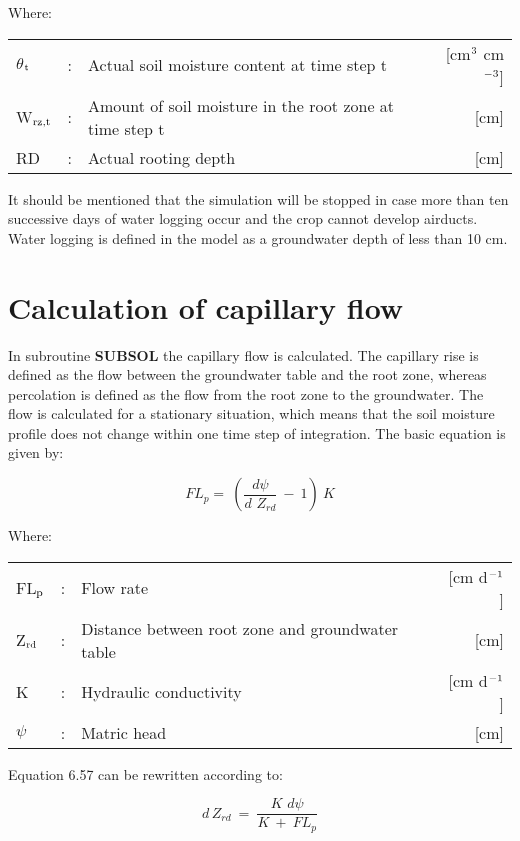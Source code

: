 Where:\\[5pt]
\begin{tabularx}{\textwidth}{llXr}
$\theta$$_{{\rm t}}$ &:& Actual soil moisture content at time step t  & [cm$^{{\rm 3}}$ cm$^{{\rm -3}}$]\\
W$_{{\rm rz,t}}$ &:& Amount of soil moisture in the root zone at time step t  & [cm]\\
RD &:& Actual rooting depth  & [cm]\\
\end{tabularx}

It should be mentioned that the simulation will be stopped in case more than ten successive
days of water logging occur and the crop cannot develop airducts. Water logging is defined
in the model as a groundwater depth of less than 10 cm.

\section{Calculation of capillary flow  }
\label{sec:CapillaryFlow}

In subroutine {\bf SUBSOL} the capillary flow is calculated. The capillary rise is defined as
the flow between the groundwater table and the root zone, whereas  percolation is defined
as the flow from the root zone to the groundwater. The flow is calculated for a stationary
situation, which means that the soil moisture profile does not change within one time step
of integration. The basic equation is given by:

\begin{equation}
FL _{p} =~({\frac{d \psi }{ d\,\, Z _{rd} }} ~-~ 1)~K
\end{equation}


Where:\\[5pt]
\begin{tabularx}{\textwidth}{llXr}
FL$_{{\rm p}}$ &:& Flow rate  & [cm d$^{{\rm -1}}$]\\
Z$_{{\rm rd}}$ &:& Distance between root zone and groundwater table  & [cm]\\
K &:& Hydraulic conductivity  & [cm d$^{{\rm -1}}$]\\
$\psi$ &:& Matric head  & [cm]\\
\end{tabularx}

Equation 6.57 can be rewritten according to:

\begin{equation}
d\, Z _{rd} ~=~{\frac{K\,\, d \psi }{ K ~+~ FL _{p} }}
\end{equation}

